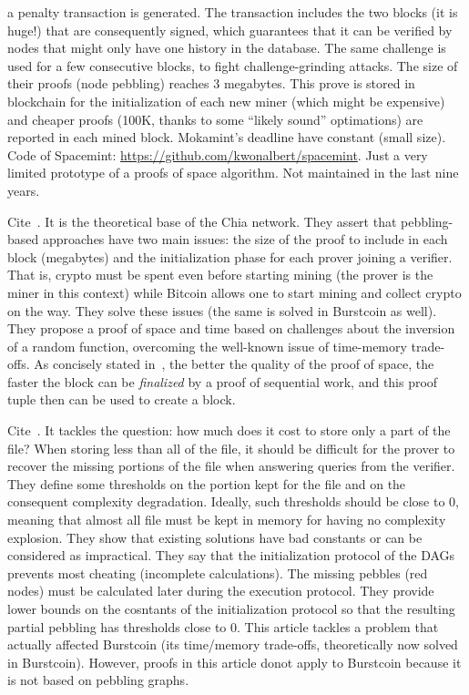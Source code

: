 a penalty transaction is generated. The transaction includes the two blocks (it is huge!)
that are consequently signed, which guarantees that it can be verified by nodes that might
only have one history in the database.
The same challenge is used for a few consecutive blocks, to fight challenge-grinding attacks.
The size of their proofs (node pebbling) reaches 3 megabytes. This prove is stored in blockchain
for the initialization of each new miner (which might be expensive) and cheaper proofs
(100K, thanks to some ``likely sound'' optimations) are reported in each mined block.
Mokamint's deadline have constant (small size).
Code of Spacemint: \url{https://github.com/kwonalbert/spacemint}. Just a very limited prototype of a
proofs of space algorithm. Not maintained in the last nine years.

Cite~\cite{AbusalahACKPR17}. It is the theoretical base of the Chia network.
They assert that pebbling-based approaches have two main issues: the size of the proof to include in each block
(megabytes) and the initialization phase for each prover joining a verifier. That is, crypto must be spent even before
starting mining (the prover is the miner in this context) while Bitcoin allows one
to start mining and collect crypto on the way.
They solve these issues (the same is solved in Burstcoin as well).
They propose a proof of space and time based on challenges about the inversion of a random function,
overcoming the well-known issue of time-memory trade-offs.
As concisely stated in~\cite{ParkKFGAP18}, the better the quality of the proof of space, the faster the block can
be \emph{finalized} by a proof of sequential work, and this
proof tuple then can be used to create a block.

Cite~\cite{Reyzin23}. It tackles the question: how much does it cost to store only a part of the file?
When storing less than all of the file, it should be difficult for the prover to recover the
missing portions of the file when answering queries from the verifier. They define some thresholds
on the portion kept for the file and on the consequent complexity degradation. Ideally, such thresholds
should be close to 0, meaning that almost all file must be kept in memory for having no complexity
explosion. They show that existing solutions have bad constants or can be considered as impractical.
They say that the initialization protocol of the DAGs prevents most cheating (incomplete calculations).
The missing pebbles (red nodes) must be calculated later during the execution protocol.
They provide lower bounds on the cosntants of the initialization protocol so that
the resulting partial pebbling has thresholds close to 0.
This article tackles a problem that actually affected Burstcoin (its time/memory trade-offs,
theoretically now solved in Burstcoin). However, proofs in this article donot apply to Burstcoin
because it is not based on pebbling graphs.

